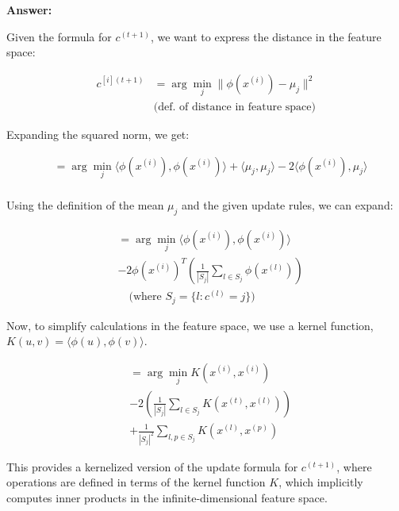 \documentclass[8pt, a4paper, landscape, includeheadfoot]{extarticle}
\begin{document}
\begin{multicols*}{4}
	\textbf{Answer:}

	Given the formula for $c^{(t+1)}$, we want to express the distance in the feature space:

	\begin{align*}
		c^{[i](t+1)} & = \arg\min_j \lVert \phi(x^{(i)}) - \mu_j \rVert^2 \\
		             & \text{(def. of distance in feature space)}
	\end{align*}

	Expanding the squared norm, we get:

	\begin{align*}
		 & = \arg\min_j \langle \phi(x^{(i)}), \phi(x^{(i)}) \rangle + \langle \mu_j, \mu_j \rangle - 2\langle \phi(x^{(i)}), \mu_j \rangle \\
	\end{align*}

	Using the definition of the mean $\mu_j$ and the given update rules, we can expand:

	\begin{align*}
		 & = \arg\min_j \langle \phi(x^{(i)}), \phi(x^{(i)}) \rangle                        \\
		 & - 2\phi(x^{(i)})^T \left( \frac{1}{|S_j|} \sum_{l \in S_j} \phi(x^{(l)}) \right) \\
		 & \quad \text{(where $S_j = \{ l : c^{(l)} = j \}$)}
	\end{align*}

	Now, to simplify calculations in the feature space, we use a kernel function, $K(u,v) = \langle \phi(u), \phi(v) \rangle$.

	\begin{align*}
		 & = \arg\min_j K(x^{(i)}, x^{(i)})                                       \\
		 & - 2\left( \frac{1}{|S_j|} \sum_{l \in S_j} K(x^{(t)}, x^{(l)}) \right) \\
		 & + \frac{1}{|S_j|^2} \sum_{l,p \in S_j} K(x^{(l)}, x^{(p)})
	\end{align*}

	This provides a kernelized version of the update formula for $c^{(t+1)}$, where operations are defined in terms of the kernel function $K$, which implicitly computes inner products in the infinite-dimensional feature space.


\end{multicols*}
\end{document}
